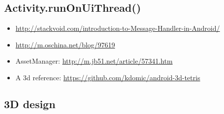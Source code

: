 \documentclass[9pt,b5paper]{article}
\begin{document}
\subsection{Activity.runOnUiThread()}
\label{sec-2-3}
\begin{itemize}
\item \url{http://stackvoid.com/introduction-to-Message-Handler-in-Android/}
\item \url{http://m.oschina.net/blog/97619}
\item AssetManager: \url{http://m.jb51.net/article/57341.htm}
\item A 3d reference: \url{https://github.com/kdomic/android-3d-tetris}
\end{itemize}
\subsection{3D design}
\label{sec-2-4}
\end{document}
